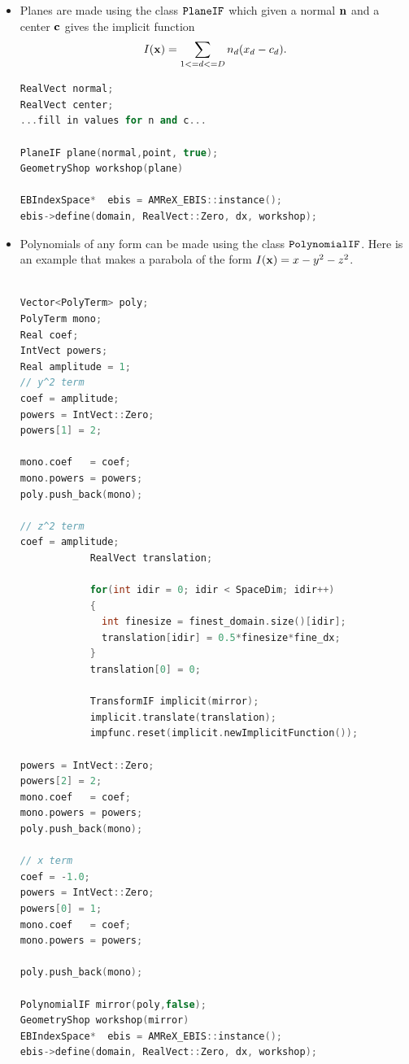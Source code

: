 \begin{itemize}

\item Planes are made using the class $\tt{PlaneIF}$ which given a normal
${\bf n}$  and a center ${\bf c}$ gives the implicit function 
$$
I({\bf x}) = \sum_{1<=d<=D} n_d (x_d - c_d).
$$

\begin{lstlisting}[language=cpp]
RealVect normal; 
RealVect center;
...fill in values for n and c...

PlaneIF plane(normal,point, true);
GeometryShop workshop(plane)

EBIndexSpace*  ebis = AMReX_EBIS::instance();
ebis->define(domain, RealVect::Zero, dx, workshop);

\end{lstlisting}

\item Polynomials of any form can be made using the class
  $\tt{PolynomialIF}$.  Here is an example that makes a parabola of
  the form $I({\bf x}) = x - y^2 - z^2$. 
\begin{lstlisting}[language=cpp]

Vector<PolyTerm> poly;
PolyTerm mono;
Real coef;
IntVect powers;
Real amplitude = 1;
// y^2 term
coef = amplitude;
powers = IntVect::Zero;
powers[1] = 2;

mono.coef   = coef;
mono.powers = powers;
poly.push_back(mono);

// z^2 term
coef = amplitude;
            RealVect translation;
      
            for(int idir = 0; idir < SpaceDim; idir++)
            {
              int finesize = finest_domain.size()[idir];
              translation[idir] = 0.5*finesize*fine_dx;
            }
            translation[0] = 0;

            TransformIF implicit(mirror);
            implicit.translate(translation);
            impfunc.reset(implicit.newImplicitFunction());

powers = IntVect::Zero;
powers[2] = 2;
mono.coef   = coef;
mono.powers = powers;
poly.push_back(mono);

// x term
coef = -1.0;
powers = IntVect::Zero;
powers[0] = 1;
mono.coef   = coef;
mono.powers = powers;

poly.push_back(mono);

PolynomialIF mirror(poly,false);
GeometryShop workshop(mirror)
EBIndexSpace*  ebis = AMReX_EBIS::instance();
ebis->define(domain, RealVect::Zero, dx, workshop);
\end{lstlisting}

\end{itemize}
